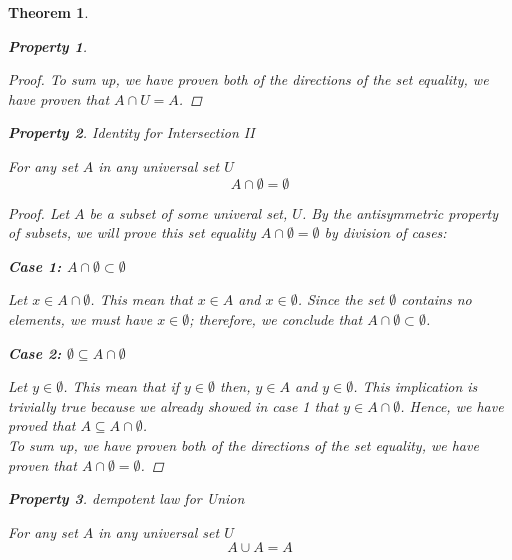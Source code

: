 \documentclass{book}
\newtheorem{theorem}{Theorem}[section]
\newtheorem{property}{Property}[theorem]
\theoremstyle{definition}
\theoremstyle{remark}
\begin{document}
\begin{theorem}
\begin{property}
\begin{proof}
            To sum up, we have proven both of the directions of the set equality, we have proven that $A \cap U = A$. 
        \end{proof}
    \end{property}
    
    
    \begin{property}
    Identity for Intersection II \\
        \begin{tcolorbox}
            For any set $A$ in any universal set $U$
                \begin{equation*}
                    A \cap \emptyset = \emptyset
                \end{equation*}
        \end{tcolorbox}
    
        \begin{proof}
            Let $A$ be a subset of some univeral set, $U$. By the antisymmetric property of subsets, we will prove this set equality $A \cap \emptyset = \emptyset$ by division of cases:
            
            \begin{flushleft} \textbf{Case 1: $A \cap \emptyset \subset \emptyset$} \end{flushleft}
                Let $x \in A \cap \emptyset $. This mean that $x \in A$ and $x \in \emptyset$. Since the set $\emptyset$ contains no elements, we must have $x \in \emptyset$; therefore, we conclude that $A \cap \emptyset \subset \emptyset$.
            
            \begin{flushleft} \textbf{Case 2: $\emptyset \subseteq A \cap \emptyset$} \end{flushleft} 
                Let $y \in \emptyset$. This mean that if  $y \in \emptyset$ then, $y \in A$ and $y \in \emptyset$. This implication  is trivially true because we already showed in \textit{case 1} that $y \in A \cap \emptyset$. Hence, we have proved that $A \subseteq A \cap \emptyset$. \\
            
            To sum up, we have proven both of the directions of the set equality, we have proven that $A \cap \emptyset = \emptyset$. 
        \end{proof}
    \end{property}
    
    
    
    \newpage
    \begin{property}
    dempotent law for Union \\
        \begin{tcolorbox}
            For any set $A$ in any universal set $U$
                \begin{equation*}
                    A \cup A = A
                \end{equation*}
        \end{tcolorbox}
    

\end{property}
\end{theorem}
\end{document}
